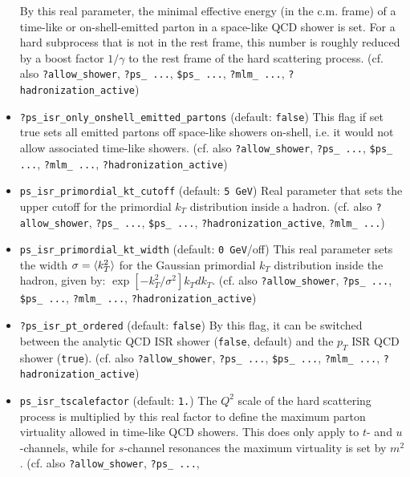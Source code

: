 \documentclass[12pt]{book}
\newcommand{\ttt}[1]{\texttt{#1}}
\begin{document}
\begin{itemize}
By this real parameter, the minimal effective energy (in the
c.m. frame) of a time-like or on-shell-emitted parton in a space-like
QCD shower is set. For a hard subprocess that is not in the rest frame,
this number is roughly reduced by a boost factor $1/\gamma$ to the
rest frame of the hard scattering process.  (cf. also
\ttt{?allow\_shower}, \ttt{?ps\_   ...}, \ttt{\$ps\_ ...}, \ttt{?mlm\_
  ...}, \ttt{?hadronization\_active})   
\item
\ttt{?ps\_isr\_only\_onshell\_emitted\_partons} \qquad (default:
\ttt{false}) \newline
This flag if set true sets all emitted partons off space-like showers
on-shell, i.e. it would not allow associated time-like showers.  (cf. also
\ttt{?allow\_shower}, \ttt{?ps\_   ...}, \ttt{\$ps\_ ...}, \ttt{?mlm\_
  ...}, \ttt{?hadronization\_active})   
\item
\ttt{ps\_isr\_primordial\_kt\_cutoff} \qquad (default: \ttt{5
GeV}) \newline
Real parameter that sets the upper cutoff for the primordial $k_T$
distribution inside a hadron.  (cf. also
\ttt{?allow\_shower}, \ttt{?ps\_   ...}, \ttt{\$ps\_ ...},
\ttt{?hadronization\_active}, \ttt{?mlm\_ ...})    
\item
\ttt{ps\_isr\_primordial\_kt\_width} \qquad (default: \ttt{0
GeV}/off) \newline
This real parameter sets the width $\sigma = \mathinner{\langle{k_T^2}\rangle}$ for the
Gaussian primordial $k_T$ distribution inside the hadron, given by:
$\exp[-k_T^2/\sigma^2] k_T dk_T$.  (cf. also
\ttt{?allow\_shower}, \ttt{?ps\_   ...}, \ttt{\$ps\_ ...}, \ttt{?mlm\_
  ...}, \ttt{?hadronization\_active})   
\item
\ttt{?ps\_isr\_pt\_ordered} \qquad (default: \ttt{false}) \newline
By this flag, it can be switched between the analytic QCD ISR shower
(\ttt{false}, default) and the $p_T$ ISR QCD shower
(\ttt{true}). (cf. also \ttt{?allow\_shower}, \ttt{?ps\_   ...},
\ttt{\$ps\_ ...}, \ttt{?mlm\_ ...}, \ttt{?hadronization\_active})   
\item
\ttt{ps\_isr\_tscalefactor} \qquad (default: \ttt{1.}) \newline
The $Q^2$ scale of the hard scattering process is multiplied by this
real factor to define the maximum parton virtuality allowed in
time-like QCD showers. This does only apply to $t$- and $u$-channels,
while for $s$-channel resonances the maximum virtuality is set by
$m^2$.  (cf. also \ttt{?allow\_shower}, \ttt{?ps\_   ...},

\end{itemize}
\end{document}
